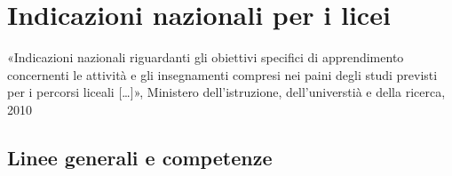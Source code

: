 \documentclass[letterpaper,10pt,italian]{jupyterBook}
\begin{document}
\sphinxstepscope


\section{Indicazioni nazionali per i licei}
\label{\detokenize{ch/school-programs/current-guidelines-italy:indicazioni-nazionali-per-i-licei}}\label{\detokenize{ch/school-programs/current-guidelines-italy::doc}}
\sphinxAtStartPar
«Indicazioni nazionali riguardanti gli obiettivi specifici di apprendimento concernenti le attività e gli insegnamenti compresi nei paini degli studi previsti per i percorsi liceali {[}…{]}», Ministero dell’istruzione, dell’universtià e della ricerca, 2010


\subsection{Linee generali e competenze}
\end{document}
